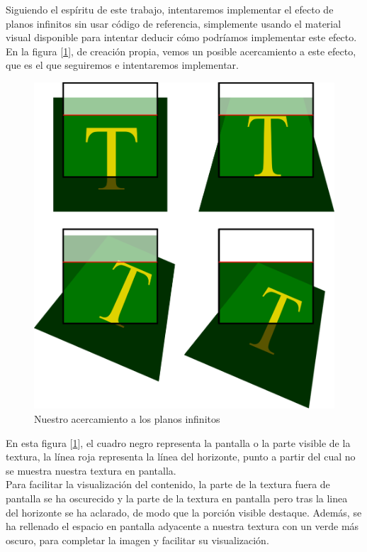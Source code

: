 Siguiendo el espíritu de este trabajo, intentaremos implementar el efecto de planos infinitos sin usar código de referencia, simplemente usando el material visual disponible para intentar deducir cómo podríamos implementar este efecto. En la figura [\ref{fig:planes}], de creación propia, vemos un posible acercamiento a este efecto, que es el que seguiremos e intentaremos implementar.\\

\begin{figure}[h]
	\centering
	\includegraphics[width=12cm]{archivos/planes}
	\caption{Nuestro acercamiento a los planos infinitos}
	\label{fig:planes}
\end{figure}

En esta figura [\ref{fig:planes}], el cuadro negro representa la pantalla o la parte visible de la textura, la línea roja representa la línea del horizonte, punto a partir del cual no se muestra nuestra textura en pantalla.\\

Para facilitar la visualización del contenido, la parte de la textura fuera de pantalla se ha oscurecido y la parte de la textura en pantalla pero tras la linea del horizonte se ha aclarado, de modo que la porción visible destaque. Además, se ha rellenado el espacio en pantalla adyacente a nuestra textura con un verde más oscuro, para completar la imagen y facilitar su visualización.\\

